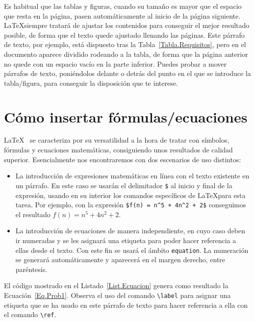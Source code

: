 

Es habitual que las tablas y figuras, cuando su tamaño es mayor que el espacio que resta en la página, pasen automáticamente al inicio de la página siguiente. \LaTeX siempre tratará de ajustar los contenidos para conseguir el mejor resultado posible, de forma que el texto quede ajustado llenando las páginas. Este párrafo de texto, por ejemplo, está dispuesto tras la Tabla~\ref{Tabla.Requisitos}, pero en el documento aparece dividido rodeando a la tabla, de forma que la página anterior no quede con un espacio vacío en la parte inferior. Puedes probar a mover párrafos de texto, poniéndolos delante o detrás del punto en el que se introduce la tabla/figura, para conseguir la disposición que te interese.

\section{Cómo insertar fórmulas/ecuaciones}

\LaTeX~ se caracteriza por su versatilidad a la hora de tratar con símbolos, fórmulas y ecuaciones matemáticas, consiguiendo unos resultados de calidad superior. Esencialmente nos encontraremos con dos escenarios de uso distintos: 

\begin{itemize}
    \item La introducción de expresiones matemáticas en línea con el texto existente en un párrafo. En este caso se usarán el delimitador \texttt{\$} al inicio y final de la expresión, usando en su interior los comandos específicos de \LaTeX para esta tarea. Por ejemplo, con la expresión \verb|$f(n) = n^5 + 4n^2 + 2$| conseguimos el resultado $f(n) = n^5 + 4n^2 + 2$.
    
    \item La introducción de ecuaciones de manera independiente, en cuyo caso deben ir numeradas y se les asignará una etiqueta para poder hacer referencia a ellas desde el texto. Con este fin se usará el ámbito \verb*|equation|. La numeración se generará automáticamente y aparecerá en el margen derecho, entre paréntesis.
\end{itemize}

El código mostrado en el Listado~\ref{List.Ecuacion} genera como resultado la Ecuación~\ref{Eq.Prob1}. Observa el uso del comando \verb|\label| para asignar una etiqueta que se ha usado en este párrafo de texto para hacer referencia a ella con el comando \verb|\ref|.

